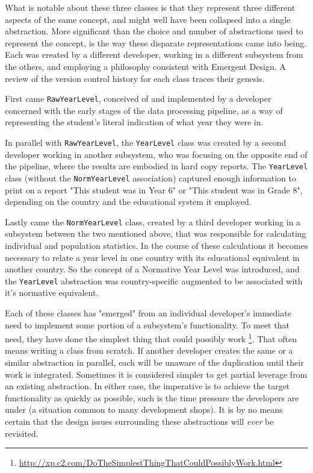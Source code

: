 \documentclass{article}
\begin{document}
\begin{enumerate}
What is notable about these three classes is that they represent three
different aspects of the same concept, and might well have been
collapsed into a single abstraction. More significant than the choice
and number of abstractions used to represent the concept, is the way
these disparate representations came into being. Each was created by a
different developer, working in a different subsystem from the others,
and employing a philosophy consistent with Emergent Design. A review of
the version control history for each class traces their genesis.

First came \texttt{RawYearLevel}, conceived of and implemented by a developer
concerned with the early stages of the data processing pipeline, as a
way of representing the student's literal indication of what year they
were in.

In parallel with \texttt{RawYearLevel}, the \texttt{YearLevel} class was created by a
second developer working in another subsystem, who was focusing on the
opposite end of the pipeline, where the results are embodied in hard
copy reports. The \texttt{YearLevel} class (without the \texttt{NormYearLevel}
association) captured enough information to print on a report "This
student was in Year 6" or "This student was in Grade 8", depending on
the country and the educational system it employed.

Lastly came the \texttt{NormYearLevel} class, created by a third developer
working in a subsystem between the two mentioned above, that was
responsible for calculating individual and population statistics. In the
course of these calculations it becomes necessary to relate a year level
in one country with its educational equivalent in another country. So
the concept of a Normative Year Level was introduced, and the
\texttt{YearLevel} abstraction was country-specific augmented to be associated
with it's normative equivalent.

Each of these classes has "emerged" from an individual developer's
immediate need to implement some portion of a subsystem's functionality.
To meet that need, they have done the simplest thing that could possibly
work \footnote{\url{http://xp.c2.com/DoTheSimplestThingThatCouldPossiblyWork.html}}. That often means writing a class from scratch. If another
developer creates the same or a similar abstraction in parallel, each
will be unaware of the duplication until their work is integrated.
Sometimes it is considered simpler to get partial leverage from an
existing abstraction. In either case, the imperative is to achieve the
target functionality as quickly as possible, such is the time pressure
the developers are under (a situation common to many development shops).
It is by no means certain that the design issues surrounding these
abstractions will \emph{ever} be revisited.


\end{enumerate}
\end{document}

